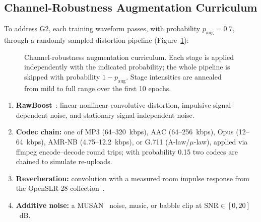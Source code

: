 \subsection{Channel-Robustness Augmentation Curriculum}
\label{ssec:augmentation}

To address G2, each training waveform passes, with probability $p_{\text{aug}} = 0.7$,
through a randomly sampled distortion pipeline (Figure~\ref{fig:aug}):

\begin{figure}[t]
\centering
{}
\caption{Channel-robustness augmentation curriculum. Each stage is applied
independently with the indicated probability; the whole pipeline is skipped with
probability $1-p_{\text{aug}}$. Stage intensities are annealed from mild to full range
over the first 10 epochs.}
\label{fig:aug}
\end{figure}

\begin{enumerate}
    \item \textbf{RawBoost}~\cite{tak2022rawboost}: linear-nonlinear convolutive
        distortion, impulsive signal-dependent noise, and stationary signal-independent
        noise.
    \item \textbf{Codec chain:} one of MP3 (64--320~kbps), AAC (64--256~kbps), Opus
        (12--64~kbps), AMR-NB (4.75--12.2~kbps), or G.711 (A-law/$\mu$-law), applied via
        ffmpeg encode--decode round trips; with probability 0.15 two codecs are chained
        to simulate re-uploads.
    \item \textbf{Reverberation:} convolution with a measured room impulse response
        from the OpenSLR-28 collection~\cite{ko2017rir}.
    \item \textbf{Additive noise:} a MUSAN~\cite{snyder2015musan} noise, music, or
        babble clip at $\mathrm{SNR} \in [0, 20]$~dB.
\end{enumerate}

